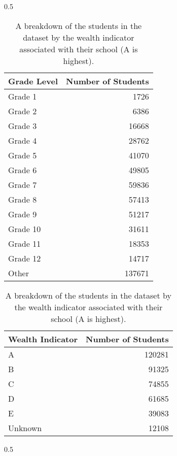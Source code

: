 \documentclass{article}
\begin{document}
\label{section:app:data}
\newcommand\pageSplitL{0.5}
\newcommand\pageSplitR{0.5}   
\newcommand\captionwidthr{0.7}   
\begin{table}[h]

 \begin{subtable}[b]{\pageSplitL\linewidth}
   \captionsetup{width=\captionwidthr\linewidth}
    {\begin{tabular}{lr}
      \toprule
      \multicolumn{1}{r}{\bf Grade Level} & \multicolumn{1}{c}{ \bf Number of Students} \\
      \midrule
      Grade 1 & 1726 \\
      Grade 2 & 6386 \\
      Grade 3 & 16668 \\
      Grade 4 & 28762 \\
      Grade 5 & 41070 \\
      Grade 6 & 49805 \\
      Grade 7 & 59836 \\
      Grade 8 & 57413 \\
      Grade 9 & 51217 \\
      Grade 10 & 31611 \\
      Grade 11 & 18353 \\
      Grade 12 & 14717 \\
      Other & 137671 \\
      \bottomrule
\end{tabular}
\caption{A breakdown of the students in the dataset by grade level.}

  \begin{tabular}{lr}
      \toprule
      \multicolumn{1}{r}{\bf Wealth Indicator} & \multicolumn{1}{c}{ \bf Number of Students} \\
      \midrule
      A & 120281 \\
      B & 91325 \\
      C & 74855 \\
      D & 61685 \\
      E & 39083 \\
      Unknown & 12108 \\
      \bottomrule
\end{tabular}
\caption{A breakdown of the students in the dataset by the wealth indicator associated with their school (A is highest).}}
\end{subtable}%
\begin{subtable}[b]{\pageSplitR\linewidth}{
\captionsetup{width=\captionwidthr\linewidth}
  
}
\end{subtable}
\end{table}
\end{document}
